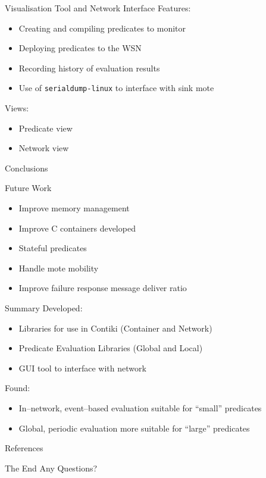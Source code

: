 \documentclass[usenames,dvipsnames]{beamer}
\newcommand{\subtitleframe}[1]{\begin{frame}\begin{block}{\centering\Large \vspace{1em} #1 \vspace{1em}}\end{block}\end{frame}}
\begin{document}
\begin{frame}{Visualisation Tool and Network Interface}
Features:
\begin{itemize}
	\item Creating and compiling predicates to monitor
	\item Deploying predicates to the WSN
	\item Recording history of evaluation results
	\item Use of \texttt{serialdump-linux} to interface with sink mote
\end{itemize}
\vspace{1em}

Views:
\begin{itemize}
	\item Predicate view
	\item Network view
\end{itemize}
\end{frame}


\subtitleframe{Conclusions}

\begin{frame}{Future Work}
	\begin{itemize}
		\item Improve memory management
		\item Improve C containers developed
		\item Stateful predicates
		\item Handle mote mobility
		\item Improve failure response message deliver ratio
	\end{itemize}
\end{frame}

\begin{frame}{Summary}
Developed:
	\begin{itemize}
		\item Libraries for use in Contiki (Container and Network)
		\item Predicate Evaluation Libraries (Global and Local)
		\item GUI tool to interface with network
	\end{itemize}
\vspace{1em}

Found:
	\begin{itemize}
		\item In--network, event--based evaluation suitable for ``small'' predicates
		\item Global, periodic evaluation more suitable for ``large'' predicates
	\end{itemize}
\end{frame}

\begin{frame}[allowframebreaks]{References}
	
	
\end{frame}

\begin{frame}{The End}
Any Questions?
\end{frame}
\end{document}
